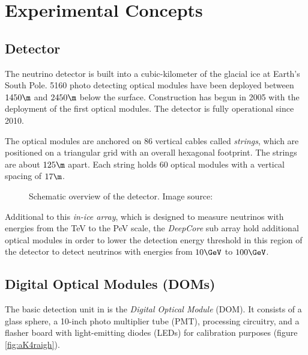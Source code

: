 
\section{Experimental Concepts}
\label{sec:experimental_background}

\subsection{\icecube Detector}

The \icecube neutrino detector is built into a cubic-kilometer of the glacial ice at Earth's South Pole. 5160 photo detecting optical modules have been deployed between $1450\m$ and $2450\m$ below the surface. Construction has begun in 2005 with the deployment of the first optical modules. The detector is fully operational since 2010. \cite{instrumentation}

The optical modules are anchored on 86 vertical cables called \textit{strings}, which are positioned on a triangular grid with an overall hexagonal footprint. The strings are about $125\m$ apart. Each string holds 60 optical modules with a vertical spacing of $17\m$. \cite{instrumentation}

\begin{figure}[htbp]
  \caption{Schematic overview of the \icecube detector. Image source: \cite{instrumentation}}
  \label{fig:aiThai0e}
\end{figure}

Additional to this \textit{in-ice array}, which is designed to measure neutrinos with energies from the TeV to the PeV scale, the \textit{DeepCore} sub array hold additional optical modules in order to lower the detection energy threshold in this region of the detector to detect neutrinos with energies from $10\GeV$ to $100\GeV$. \cite{instrumentation}


\subsection{Digital Optical Modules (DOMs)}
\label{sec:doms}

The basic detection unit in \icecube is the \textit{Digital Optical Module} (DOM). It consists of a glass sphere, a 10-inch photo multiplier tube (PMT), processing circuitry, and a flasher board with light-emitting diodes (LEDs) for calibration purposes (figure \ref{fig:aK4raigh}). \cite{instrumentation}


